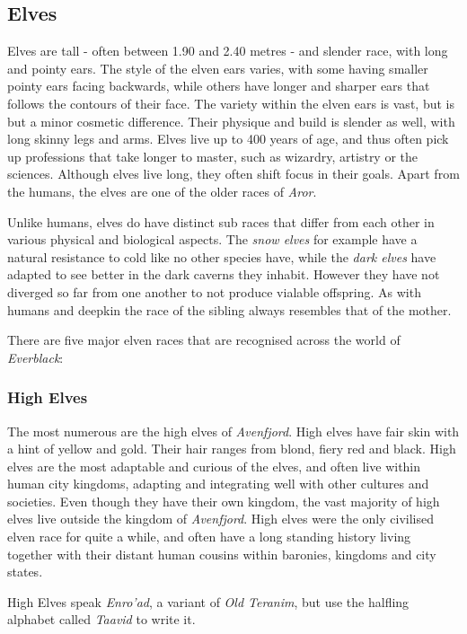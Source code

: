 \subsection{Elves}
\label{sec:Elves}

Elves are tall - often between 1.90 and 2.40 metres - and slender race, with
long and pointy ears. The style of the elven ears varies, with some having
smaller pointy ears facing backwards, while others have longer and sharper
ears that follows the contours of their face. The variety within the elven
ears is vast, but is but a minor cosmetic difference. Their physique and build
is slender as well, with long skinny legs and arms. Elves live up to 400 years
of age, and thus often pick up professions that take longer to master, such as
wizardry, artistry or the sciences. Although elves live long, they often shift
focus in their goals. Apart from the humans, the elves are one of the older
races of \emph{Aror}.

Unlike humans, elves do have distinct sub races that differ from each other in
various physical and biological aspects. The \emph{snow elves} for example
have a natural resistance to cold like no other species have, while the
\emph{dark elves} have adapted to see better in the dark caverns they
inhabit. However they have not diverged so far from one another to not produce
vialable offspring. As with humans and deepkin the race of the sibling always
resembles that of the mother.

There are five major elven races that are recognised across the world of
\emph{Everblack}:

\subsubsection*{High Elves}
\label{sec:High Elves}

The most numerous are the high elves of \emph{Avenfjord}. High elves have
fair skin with a hint of yellow and gold. Their hair ranges from blond, fiery
red and black. High elves are the most adaptable and curious of the
elves, and often live within human city kingdoms, adapting and integrating
well with other cultures and societies. Even though they have their own
kingdom, the vast majority of high elves live outside the kingdom
of \emph{Avenfjord}. High elves were the only civilised elven race for
quite a while, and often have a long standing history living together with
their distant human cousins within baronies, kingdoms and city states.

High Elves speak \emph{Enro'ad}, a variant of \emph{Old Teranim}, but use the
halfling alphabet called \emph{Taavid} to write it.

